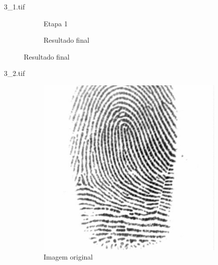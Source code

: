 \documentclass{beamer}
\begin{document}
\begin{frame}{3\_1.tif}
\begin{figure}
\begin{subfigure}[!ht]{0.32\textwidth}
                \caption{Etapa 1}
            \end{subfigure}
            \begin{subfigure}[!ht]{0.32\textwidth}
                \caption{Resultado final}
            \end{subfigure}
        \end{figure}
    \end{frame}

    \begin{frame}{3\_2.tif}
        \begin{figure}
            \centering
            \begin{subfigure}[!ht]{0.32\textwidth}
                \includegraphics[width=\columnwidth]{Fingerprints/3_2.jpg}
                \caption{Imagem original}
            \end{subfigure}
            \begin{subfigure}[!ht]{0.32\textwidth}

\end{subfigure}
\end{figure}
\end{frame}
\end{document}
